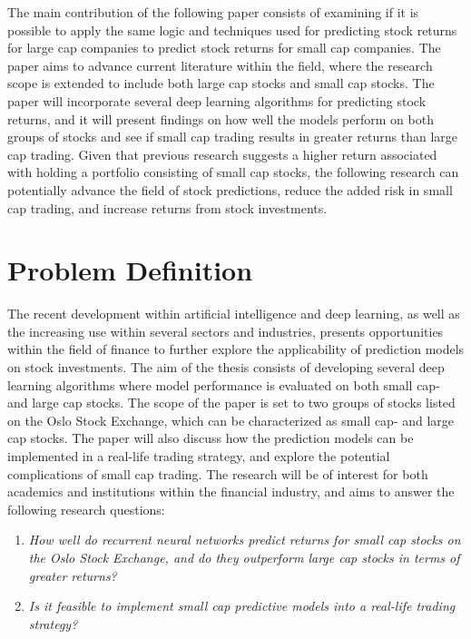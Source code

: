 \indent \newline 
The main contribution of the following paper consists of examining if it is possible to apply the same logic and techniques used for predicting stock returns for large cap companies to predict stock returns for small cap companies. The paper aims to advance current literature within the field, where the research scope is extended to include both large cap stocks and small cap stocks. The paper will incorporate several deep learning algorithms for predicting stock returns, and it will present findings on how well the models perform on both groups of stocks and see if small cap trading results in greater returns than large cap trading. Given that previous research suggests a higher return associated with holding a portfolio consisting of small cap stocks, the following research can potentially advance the field of stock predictions, reduce the added risk in small cap trading, and increase returns from stock investments.  

\section{Problem Definition}
The recent development within artificial intelligence and deep learning, as well as the increasing use within several sectors and industries, presents opportunities within the field of finance to further explore the applicability of prediction models on stock investments. The aim of the thesis consists of developing several deep learning algorithms where model performance is evaluated on both small cap- and large cap stocks. The scope of the paper is set to two groups of stocks listed on the Oslo Stock Exchange, which can be characterized as small cap- and large cap stocks. The paper will also discuss how the prediction models can be implemented in a real-life trading strategy, and explore the potential complications of small cap trading. The research will be of interest for both academics and institutions within the financial industry, and aims to answer the following research questions:  

\indent \newline
\begin{enumerate}
\item \textit{How well do recurrent neural networks predict returns for small cap stocks on the Oslo Stock Exchange, and do they outperform large cap stocks in terms of greater returns?}
\item \textit{Is it feasible to implement small cap predictive models into a real-life trading strategy?}
\end{enumerate}

